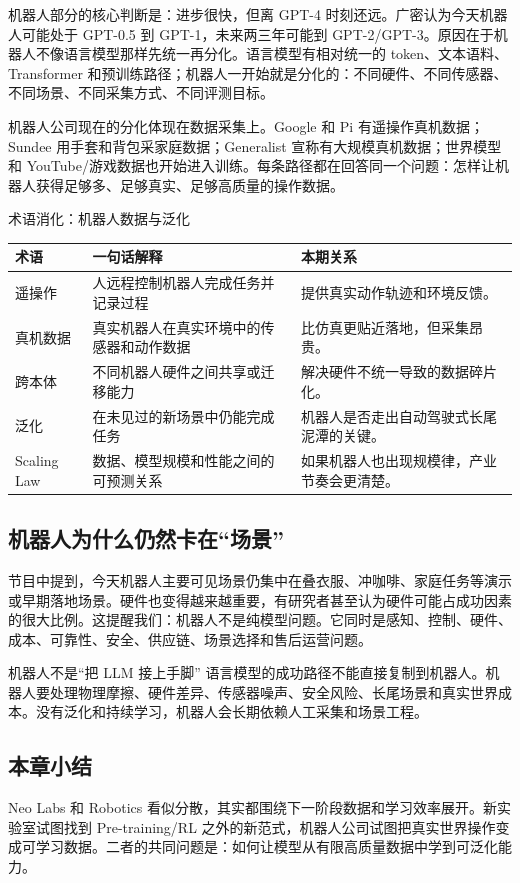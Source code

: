 机器人部分的核心判断是：进步很快，但离 GPT-4 时刻还远。广密认为今天机器人可能处于 GPT-0.5 到 GPT-1，未来两三年可能到 GPT-2/GPT-3。原因在于机器人不像语言模型那样先统一再分化。语言模型有相对统一的 token、文本语料、Transformer 和预训练路径；机器人一开始就是分化的：不同硬件、不同传感器、不同场景、不同采集方式、不同评测目标。

机器人公司现在的分化体现在数据采集上。Google 和 Pi 有遥操作真机数据；Sundee 用手套和背包采家庭数据；Generalist 宣称有大规模真机数据；世界模型和 YouTube/游戏数据也开始进入训练。每条路径都在回答同一个问题：怎样让机器人获得足够多、足够真实、足够高质量的操作数据。

\begin{knowledgebox}{术语消化：机器人数据与泛化}
\begin{tabularx}{\textwidth}{p{}p{}X}
\toprule
术语 & 一句话解释 & 本期关系 \\
\midrule
遥操作 & 人远程控制机器人完成任务并记录过程 & 提供真实动作轨迹和环境反馈。 \\
真机数据 & 真实机器人在真实环境中的传感器和动作数据 & 比仿真更贴近落地，但采集昂贵。 \\
跨本体 & 不同机器人硬件之间共享或迁移能力 & 解决硬件不统一导致的数据碎片化。 \\
泛化 & 在未见过的新场景中仍能完成任务 & 机器人是否走出自动驾驶式长尾泥潭的关键。 \\
Scaling Law & 数据、模型规模和性能之间的可预测关系 & 如果机器人也出现规模律，产业节奏会更清楚。 \\
\bottomrule
\end{tabularx}
\end{knowledgebox}

\subsection{机器人为什么仍然卡在“场景”}

节目中提到，今天机器人主要可见场景仍集中在叠衣服、冲咖啡、家庭任务等演示或早期落地场景。硬件也变得越来越重要，有研究者甚至认为硬件可能占成功因素的很大比例。这提醒我们：机器人不是纯模型问题。它同时是感知、控制、硬件、成本、可靠性、安全、供应链、场景选择和售后运营问题。

\begin{warningbox}{机器人不是“把 LLM 接上手脚”}
语言模型的成功路径不能直接复制到机器人。机器人要处理物理摩擦、硬件差异、传感器噪声、安全风险、长尾场景和真实世界成本。没有泛化和持续学习，机器人会长期依赖人工采集和场景工程。
\end{warningbox}

\subsection{本章小结}

Neo Labs 和 Robotics 看似分散，其实都围绕下一阶段数据和学习效率展开。新实验室试图找到 Pre-training/RL 之外的新范式，机器人公司试图把真实世界操作变成可学习数据。二者的共同问题是：如何让模型从有限高质量数据中学到可泛化能力。

